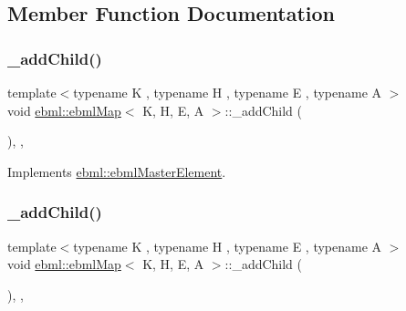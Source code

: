 \subsection{Member Function Documentation}
\mbox{\label{classebml_1_1ebmlMap_a50fa3572f500363282894b7978b29464}} 
\subsubsection{\texorpdfstring{\+\_\+add\+Child()}{\_addChild()}\hspace{0.1cm}{\footnotesize\ttfamily [1/2]}}
{\footnotesize\ttfamily template$<$typename K , typename H , typename E , typename A $>$ \\
void \mbox{\hyperlink{classebml_1_1ebmlMap}{ebml\+::ebml\+Map}}$<$ K, H, E, A $>$\+::\+\_\+add\+Child (\begin{DoxyParamCaption}\item[{const \mbox{\hyperlink{namespaceebml_adad533b7705a16bb360fe56380c5e7be}{ebml\+Element\+\_\+sp}} \&}]{ }\end{DoxyParamCaption})\hspace{0.3cm}{\ttfamily [override]}, {\ttfamily [protected]}, {\ttfamily [virtual]}}



Implements \mbox{\hyperlink{classebml_1_1ebmlMasterElement_a59c5f3b3409fd5fd6f0f22c7a68f1c9b}{ebml\+::ebml\+Master\+Element}}.

\mbox{\label{classebml_1_1ebmlMap_ad3e1f23ca6bb1633c1982fb2cbabb39e}} 
\subsubsection{\texorpdfstring{\+\_\+add\+Child()}{\_addChild()}\hspace{0.1cm}{\footnotesize\ttfamily [2/2]}}
{\footnotesize\ttfamily template$<$typename K , typename H , typename E , typename A $>$ \\
void \mbox{\hyperlink{classebml_1_1ebmlMap}{ebml\+::ebml\+Map}}$<$ K, H, E, A $>$\+::\+\_\+add\+Child (\begin{DoxyParamCaption}\item[{\mbox{\hyperlink{namespaceebml_adad533b7705a16bb360fe56380c5e7be}{ebml\+Element\+\_\+sp}} \&\&}]{ }\end{DoxyParamCaption})\hspace{0.3cm}{\ttfamily [override]}, {\ttfamily [protected]}, {\ttfamily [virtual]}}



